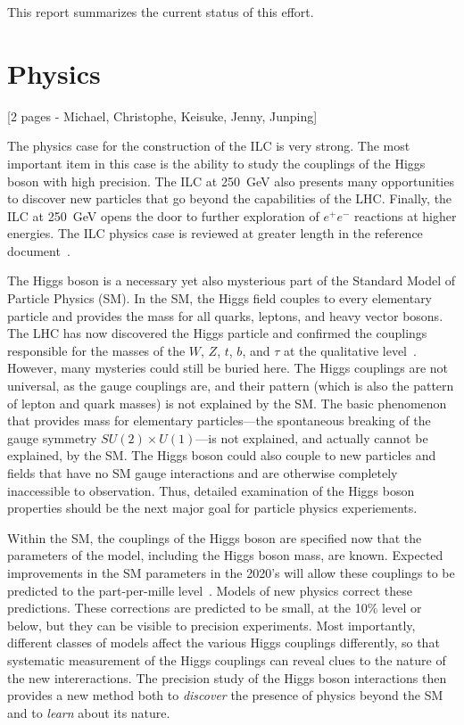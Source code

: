 \documentclass[%
 reprint,
 amsmath,amssymb,
 aps,
]{revtex4-1}
\def\ee{e^+e^-}
\begin{document}
This report summarizes the current status of this effort.



\section{\label{sec:phys}Physics}

[2 pages - Michael, Christophe, Keisuke, Jenny, Junping]

The physics case for the construction of the ILC is very strong.   The
most important item in this case is the ability to study the couplings
of the Higgs boson with high precision.  The ILC at 250~GeV also
presents many opportunities to discover new particles that go beyond
the capabilities of the LHC.  Finally, the ILC at 250~GeV opens the
door to further exploration of $\ee$ reactions at higher energies. 
The ILC physics case is reviewed at greater length in the reference
document~\cite{ILCforESS}. 

The Higgs boson is a necessary yet also mysterious part of the
Standard Model of Particle Physics (SM).    In the SM, the Higgs field
couples to every elementary particle and provides the mass for all
quarks, leptons, and heavy vector bosons.   The LHC has now discovered
the Higgs particle and confirmed the couplings responsible for the
masses of the $W$, $Z$, $t$, $b$, and $\tau$ at the qualitative
level~\cite{LHCHiggssummary}.  However, many mysteries could still be
buried here.   The Higgs couplings are not universal, as the gauge
couplings are, and their pattern (which is also the pattern of lepton
and quark masses) is not explained by the SM.  The basic phenomenon that provides
mass for elementary particles---the spontaneous breaking of the gauge
symmetry $SU(2)\times U(1)$---is not explained, and actually cannot be
explained, by the SM.   The Higgs boson could also couple to new
particles and fields that have no SM gauge interactions and are
otherwise completely inaccessible to observation.  Thus, detailed
examination of the Higgs boson properties should be the next major
goal for particle physics experiements.

Within the SM, the couplings of the Higgs boson are specified now that
the parameters of the model, including the Higgs boson mass, are
known.  Expected improvements in the SM parameters in the 2020's will
allow these couplings to be predicted to the part-per-mille level~\cite{Lepage:2014fla}.
Models of new physics correct  these predictions.   These corrections
are predicted to be small, at the 10\% level or below, but they can
be visible to precision experiments.   Most importantly, different
classes of models affect the various Higgs couplings differently, so that
systematic measurement of the Higgs couplings can reveal clues to the
nature of the new intereractions.   The precision study of the Higgs
boson interactions then provides a new method both to {\it discover}  the
presence of physics beyond the SM and to {\it learn}  about its nature.
\end{document}
